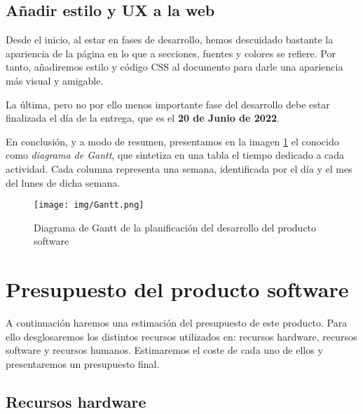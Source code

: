 \subsection*{Añadir estilo y UX a la web}

Desde el inicio, al estar en fases de desarrollo, hemos descuidado bastante la apariencia de la página en lo que a secciones, fuentes y colores se refiere. Por tanto, añadiremos estilo y código CSS al documento para darle una apariencia más visual y amigable.

La última, pero no por ello menos importante fase del desarrollo debe estar finalizada el día de la entrega, que es el \textbf{20 de Junio de 2022}.

\vspace{0.5cm}

En conclusión, y a modo de resumen, presentamos en la imagen \ref{fig:Gantt} el conocido como \textit{diagrama de Gantt}, que sintetiza en una tabla el tiempo dedicado a cada actividad. Cada columna representa una semana, identificada por el día y el mes del lunes de dicha semana.

\begin{figure} [ht]
    \centering
    \texttt{[image: img/Gantt.png]}
    \caption{Diagrama de Gantt de la planificación del desarrollo del producto software}
    \label{fig:Gantt}
\end{figure}


\section*{Presupuesto del producto software}

A continuación haremos una estimación del presupuesto de este producto. Para ello desglosaremos los distintos recursos utilizados en: recursos hardware, recursos software y recursos humanos. Estimaremos el coste de cada uno de ellos y presentaremos un presupuesto final.

\subsection*{Recursos hardware}

